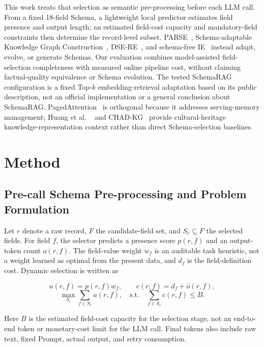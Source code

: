 \documentclass[runningheads]{llncs}
\newcommand{\schemarag}{SchemaRAG}
\begin{document}
This work treats that selection as semantic pre-processing before each LLM call. From a fixed
18-field Schema, a lightweight local predictor estimates field presence and
output length; an estimated field-cost capacity and mandatory-field constraints
then determine the record-level subset. PARSE~\cite{parse}, Schema-adaptable
Knowledge Graph Construction~\cite{adakgc}, DSE-RE~\cite{dsere}, and schema-free
IE~\cite{schemafree} instead adapt, evolve, or generate Schemas. Our evaluation
combines model-assisted field-selection completeness with measured online
pipeline cost, without claiming factual-quality equivalence or Schema evolution.
The tested \schemarag{} configuration is a fixed Top-$k$ embedding-retrieval
adaptation based on its public description, not an official implementation or a
general conclusion about SchemaRAG. PagedAttention~\cite{pagedattention} is
orthogonal because it addresses serving-memory management; Huang et al.
~\cite{huang2023} and CHAD-KG~\cite{chadkg} provide cultural-heritage
knowledge-representation context rather than direct Schema-selection baselines.

\section{Method}

\subsection{Pre-call Schema Pre-processing and Problem Formulation}

Let $r$ denote a raw record, $F$ the candidate-field set, and $S_r\subseteq F$ the selected fields. For field $f$, the selector predicts a presence score $p(r,f)$ and an output-token count $\hat{o}(r,f)$. The field-value weight $w_f$ is an auditable task heuristic, not a weight learned as optimal from the present data, and $d_f$ is the field-definition cost. Dynamic selection is written as

\begin{equation}
 u(r,f)=p(r,f)w_f,
 \qquad c(r,f)=d_f+\hat{o}(r,f),
 \label{eq:utility-cost}
\end{equation}
\begin{equation}
 \max_{S_r}\sum_{f\in S_r}u(r,f),
  \quad \mathrm{s.t.}\quad \sum_{f\in S_r}c(r,f)\leq B.
\end{equation}

Here $B$ is the estimated field-cost capacity for the selection stage, not an end-to-end token or monetary-cost limit for the LLM call. Final tokens also include raw text, fixed Prompt, actual output, and retry consumption.
\end{document}
